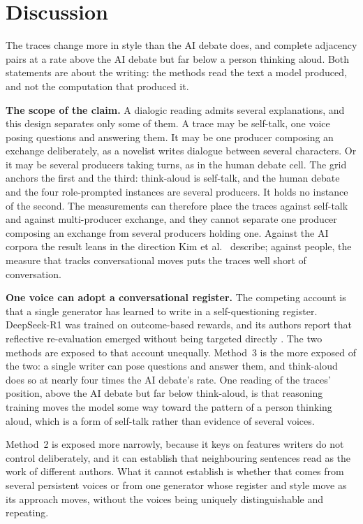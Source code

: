 \documentclass[10pt,twocolumn]{article}
\begin{document}
\section{Discussion}
The traces change more in style than the AI debate does, and complete adjacency pairs at a rate above
the AI debate but far below a person thinking aloud. Both statements are about the writing: the
methods read the text a model produced, and not the computation that produced it.

\textbf{The scope of the claim.} A dialogic reading admits several explanations, and this design
separates only some of them. A trace may be self-talk, one voice posing questions and answering them.
It may be one producer composing an exchange deliberately, as a novelist writes dialogue between
several characters. Or it may be several producers taking turns, as in the human debate cell. The
grid anchors the first and the third: think-aloud is self-talk, and the human debate and the four
role-prompted instances are several producers. It holds no instance of the second. The measurements
can therefore place the traces against self-talk and against multi-producer exchange, and they cannot
separate one producer composing an exchange from several producers holding one. Against the AI
corpora the result leans in the direction Kim et al.~\cite{kim2026} describe; against people, the
measure that tracks conversational moves puts the traces well short of conversation.

\textbf{One voice can adopt a conversational register.} The competing account is that a single
generator has learned to write in a self-questioning register. DeepSeek-R1 was trained on
outcome-based rewards, and its authors report that reflective re-evaluation emerged without being
targeted directly \cite{guo2025}. The two methods are exposed to that account unequally. Method~3 is
the more exposed of the two: a single writer can pose questions and answer them, and think-aloud
does so at nearly four times the AI debate's rate. One reading of the traces' position, above the AI
debate but far below think-aloud, is that reasoning training moves the model some way toward the
pattern of a person thinking aloud, which is a form of self-talk rather than evidence of several
voices.

Method~2 is exposed more narrowly, because it keys on features writers do not control
deliberately, and it can establish that neighbouring sentences read as the work of different
authors. What it cannot establish is whether that comes from several persistent voices or from one
generator whose register and style move as its approach moves, without the voices being uniquely
distinguishable and repeating.
\end{document}
